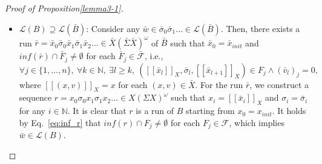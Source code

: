 \begin{proof}[Proof of Proposition\ref{lemma3-1}]
\begin{itemize}
  	\item $ \mathcal{L}(B) \supseteq \mathcal{L}(\bar{B}) $:
  	Consider any $ \bar{w} \in \bar{\sigma}_0 \bar{\sigma}_1 \ldots \in \mathcal{L}(\bar{B}) $.
  	Then, there exists a run $ \bar{r} = \bar{x}_0 \bar{\sigma}_0 \bar{x}_1 \bar{\sigma}_1 \bar{x}_2 \ldots \in \bar{X}(\bar{\Sigma} \bar{X})^\omega $ of $ \bar{B} $ such that $ \bar{x}_0 = \bar{x}_{init} $ and $ inf(\bar{r}) \cap \bar{F}_j \neq \emptyset $ for each $ \bar{F}_j \in \bar{\mathcal{F}} $, i.e.,
  	\begin{equation}
  	\label{eq:inf_r}
  	\forall j \in \{1, \ldots, n\}, \
  	\forall k \in \mathbb{N}, \ \exists l \geq k, \
  	( [\![ \bar{x}_l ]\!]_X , \bar{\sigma}_l, [\![ \bar{x}_{l+1} ]\!]_X) \in F_j \land (\bar{v}_l)_j = 0 ,
  	\end{equation}
  	where $ [\![ (x,v) ]\!]_X = x $ for each $ (x,v) \in \bar{X} $.
  	For the run $ \bar{r} $, we construct a sequence $ r = x_0 \sigma_0 x_1 \sigma_1 x_2 \ldots \in X(\Sigma X)^\omega $ such that $ x_i = [\![ \bar{x}_i ]\!]_X $ and $ \sigma_i = \bar{\sigma}_i $ for any $ i \in \mathbb{N} $.
  	It is clear that $ r $ is a run of $ B $ starting from $ x_0 = x_{init} $.
  	It holds by Eq.~\eqref{eq:inf_r} that $ inf(r) \cap F_j \neq \emptyset $ for each $ F_j \in \mathcal{F} $, which implies $ \bar{w} \in \mathcal{L}(B) $.
  \end{itemize}
\end{proof}
